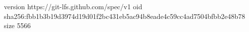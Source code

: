 version https://git-lfs.github.com/spec/v1
oid sha256:fbb1b3b19d3974d19d01f2bc431eb5ac94b8eade4c59cc4ad7504bfbb2e48b78
size 5566
